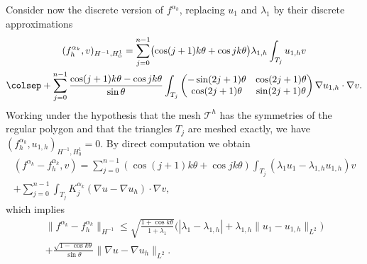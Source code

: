 Consider now the discrete version of $f^{\alpha_k}$, replacing $u_1$ and $\lambda_1$ by their discrete approximations\vspace*{-5pt}
\begin{multline*}
(f_h^{\alpha_k},v)_{H^{-1},H_0^1} = \sum_{j=0}^{n-1} \bigl(\cos (j+1)k\theta+\cos jk\theta\bigr) \lambda_{1,h} \int_{T_j} u_{1,h}v\\
\colsep+ \sum_{j=0}^{n-1} \frac{\cos(j+1)k\theta-\cos jk\theta}{\sin \theta} \int_{T_j}\begin{pmatrix}
-\sin (2j+1)\theta & \cos (2j+1) \theta \\
\cos(2j+1)\theta & \sin (2j+1)\theta
\end{pmatrix}\nabla u_{1,h} \cdot \nabla v.
\end{multline*}
Working under the hypothesis that the mesh $\mathcal T^h$ has the symmetries of the regular polygon and that the triangles $T_j$ are meshed exactly, we have $(f_h^{\alpha_k},u_{1,h})_{H^{-1},H_0^1} = 0$. By direct computation we obtain\vspace*{-5pt}
\begin{multline*}
(f^{\alpha_k}-f^{\alpha_k}_h,v) = \sum_{j=0}^{n-1} (\cos (j+1)k\theta+\cos jk\theta) \int_{T_j}(\lambda_1 u_1-\lambda_{1,h}u_{1,h})v\\[-8pt]
+ \sum_{j=0}^{n-1} \int_{T_j}K_j^{\alpha_k}(\nabla u - \nabla u_h)\cdot \nabla v,
\end{multline*}
which implies
\vspace*{-5pt}
\begin{multline*}
\|f^{\alpha_k}-f_h^{\alpha_k} \|_{H^{-1}} \leq \sqrt{\frac{1+\cos k\theta}{1+\lambda_1}}\bigl(|\lambda_1-\lambda_{1,h}|+\lambda_{1,h}\|u_1-u_{1,h}\|_{L^2}\bigr)\\
+ \frac{\sqrt{1-\cos k\theta}}{\sin \theta} \|\nabla u-\nabla u_h\|_{L^2}.
\end{multline*}

